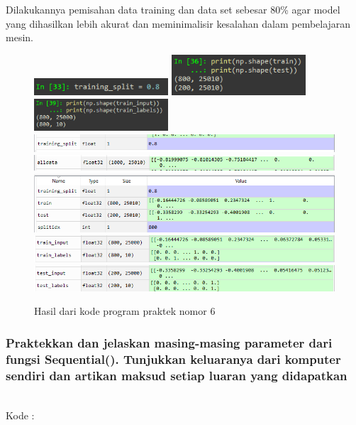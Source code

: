 Dilakukannya pemisahan data training dan data set sebesar 80\% agar model yang dihasilkan lebih akurat dan meminimalisir kesalahan dalam pembelajaran mesin.
\begin{figure}[H]
	\centering
	\includegraphics[width=5cm]{figures/1174083/figures6/27.png}
	\includegraphics[width=5cm]{figures/1174083/figures6/31.png}
	\includegraphics[width=5cm]{figures/1174083/figures6/34.png}
	\includegraphics[width=12cm]{figures/1174083/figures6/28.png}
	\includegraphics[width=12cm]{figures/1174083/figures6/29.png}	
	\includegraphics[width=12cm]{figures/1174083/figures6/30.png}		
	\includegraphics[width=12cm]{figures/1174083/figures6/32.png}
	\includegraphics[width=12cm]{figures/1174083/figures6/33.png}			
	\caption{Hasil dari kode program praktek nomor 6}
\end{figure}

\subsubsection{Praktekkan dan jelaskan masing-masing parameter dari fungsi Sequential(). Tunjukkan keluaranya dari komputer sendiri dan artikan maksud setiap luaran yang didapatkan}
\hfill\\
Kode :


